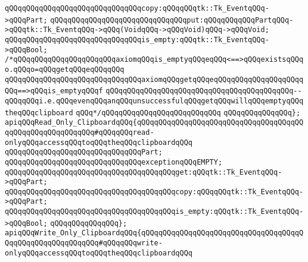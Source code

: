 \verb|qQQqqQQqqQQqqQQqqQQqqQQqqQQqqQQqcopy:qQQqqQQqtk::Tk_EventqQQq->qQQqPart;|\newline
\verb|qQQqqQQqqQQqqQQqqQQqqQQqqQQqqQQqput:qQQqqQQqqQQqPartqQQq->qQQqtk::Tk_EventqQQq->qQQq(VoidqQQq->qQQqVoid)qQQq->qQQqVoid;|\newline
\newline
\verb|qQQqqQQqqQQqqQQqqQQqqQQqqQQqqQQqis_empty:qQQqtk::Tk_EventqQQq->qQQqBool;|\newline
\newline
\verb|/*qQQqqQQqqQQqqQQqqQQqqQQqaxiomqQQqis_emptyqQQqeqQQq<==>qQQqexistsqQQqo.qQQqo=qQQqgetqQQqeqQQqqQQq|\newline
\verb|qQQqqQQqqQQqqQQqqQQqqQQqqQQqqQQqaxiomqQQqgetqQQqeqQQqqQQqqQQqqQQqqQQqqQQq==>qQQqis_emptyqQQqf|\newline
\verb|qQQqqQQqqQQqqQQqqQQqqQQqqQQqqQQqqQQqqQQqqQQq--qQQqqQQqi.e.qQQqevenqQQqanqQQqunsuccessfulqQQqgetqQQqwillqQQqemptyqQQqtheqQQqclipboard|\newline
\verb|qQQq*/qQQqqQQqqQQqqQQqqQQqqQQqqQQq|\newline
\newline
\verb|qQQqqQQqqQQqqQQq};|\newline
\newline
\verb|apiqQQqRead_Only_ClipboardqQQq{qQQqqQQqqQQqqQQqqQQqqQQqqQQqqQQqqQQqqQQqqQQqqQQqqQQqqQQqqQQq#qQQqqQQqread-onlyqQQqaccessqQQqtoqQQqtheqQQqclipboardqQQq|\newline
\newline
\verb|qQQqqQQqqQQqqQQqqQQqqQQqqQQqqQQqPart;|\newline
\newline
\verb|qQQqqQQqqQQqqQQqqQQqqQQqqQQqqQQqexceptionqQQqEMPTY;|\newline
\newline
\verb|qQQqqQQqqQQqqQQqqQQqqQQqqQQqqQQqqQQqqQQqget:qQQqtk::Tk_EventqQQq->qQQqPart;|\newline
\verb|qQQqqQQqqQQqqQQqqQQqqQQqqQQqqQQqqQQqqQQqcopy:qQQqqQQqtk::Tk_EventqQQq->qQQqPart;|\newline
\verb|qQQqqQQqqQQqqQQqqQQqqQQqqQQqqQQqqQQqqQQqis_empty:qQQqtk::Tk_EventqQQq->qQQqBool;|\newline
\newline
\verb|qQQqqQQqqQQqqQQq};|\newline
\newline
\verb|apiqQQqWrite_Only_ClipboardqQQq{qQQqqQQqqQQqqQQqqQQqqQQqqQQqqQQqqQQqqQQqqQQqqQQqqQQqqQQqqQQq#qQQqqQQqwrite-onlyqQQqaccessqQQqtoqQQqtheqQQqclipboardqQQq|\newline
